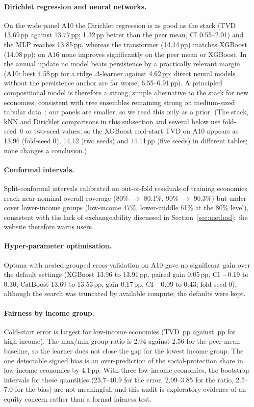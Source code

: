 \paragraph{Dirichlet regression and neural networks.} On the wide panel A10 the Dirichlet regression is as good as the stack (TVD 13.69\,pp against 13.77\,pp; 1.32\,pp better than the peer mean, CI 0.55--2.01) and the MLP reaches 13.85\,pp, whereas the transformer (14.14\,pp) matches XGBoost (14.08\,pp); on A16 none improves significantly on the peer mean or XGBoost. In the annual update no model beats persistence by a practically relevant margin (A10: best 4.58\,pp for a ridge $\Delta$-learner against 4.62\,pp; direct neural models without the persistence anchor are far worse, 6.55--6.91\,pp). A principled compositional model is therefore a strong, simple alternative to the stack for new economies, consistent with tree ensembles remaining strong on medium-sized tabular data~\cite{grinsztajn2022,shwartzziv2022}; our panels are smaller, so we read this only as a prior. (The stack, kNN and Dirichlet comparisons in this subsection and several below use fold-seed~0 or two-seed values, so the XGBoost cold-start TVD on A10 appears as 13.96 (fold-seed 0), 14.12 (two seeds) and 14.11\,pp (five seeds) in different tables; none changes a conclusion.)
\paragraph{Conformal intervals.} Split-conformal intervals calibrated on out-of-fold residuals of training economies reach near-nominal overall coverage (80\% $\to$ 80.1\%, 90\% $\to$ 90.3\%) but under-cover lower-income groups (low-income 47\%, lower-middle 61\% at the 80\% level), consistent with the lack of exchangeability discussed in Section~\ref{sec:method}; the website therefore warns users.
\paragraph{Hyper-parameter optimisation.} Optuna with nested grouped cross-validation on A10 gave no significant gain over the default settings (XGBoost 13.96 to 13.91\,pp, paired gain 0.05\,pp, CI $-0.19$ to 0.30; CatBoost 13.69 to 13.53\,pp, gain 0.17\,pp, CI $-0.09$ to 0.43; fold-seed 0), although the search was truncated by available compute; the defaults were kept.
\paragraph{Fairness by income group.} Cold-start error is largest for low-income economies (TVD \ErrLow\,pp against \ErrHigh\,pp for high-income). The max/min group ratio is 2.94 against 2.56 for the peer-mean baseline, so the learner does not close the gap for the lowest income group. The one detectable signed bias is an over-prediction of the social-protection share in low-income economies by 4.1\,pp. With three low-income economies, the bootstrap intervals for these quantities (23.7--40.9 for the error, 2.09--3.85 for the ratio, 2.5--7.0 for the bias) are not meaningful, and this audit is exploratory evidence of an equity concern rather than a formal fairness test.
